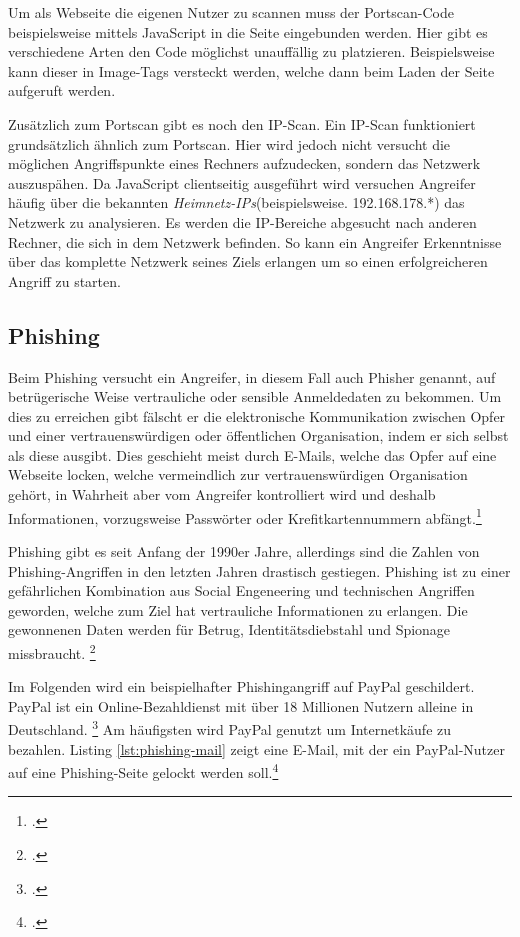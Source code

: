 Um als Webseite die eigenen Nutzer zu scannen muss der Portscan-Code beispielsweise mittels JavaScript in die Seite eingebunden werden. Hier gibt es verschiedene Arten den Code möglichst unauffällig zu platzieren. Beispielsweise kann dieser in Image-Tags versteckt werden, welche dann beim Laden der Seite aufgeruft werden.

Zusätzlich zum Portscan gibt es noch den IP-Scan. Ein IP-Scan funktioniert grundsätzlich ähnlich zum Portscan. Hier wird jedoch nicht versucht die möglichen Angriffspunkte eines Rechners aufzudecken, sondern das Netzwerk auszuspähen. Da JavaScript clientseitig ausgeführt wird versuchen Angreifer häufig über die bekannten \textit{Heimnetz-IPs}(beispielsweise. 192.168.178.*) das Netzwerk zu analysieren. Es werden die IP-Bereiche abgesucht nach anderen Rechner, die sich in dem Netzwerk befinden. So kann ein Angreifer Erkenntnisse über das komplette Netzwerk seines Ziels erlangen um so einen erfolgreicheren Angriff zu starten.

\subsection{Phishing}

Beim Phishing versucht ein Angreifer, in diesem Fall auch Phisher genannt, auf betrügerische Weise vertrauliche oder sensible Anmeldedaten zu bekommen. Um dies zu erreichen gibt fälscht er die elektronische Kommunikation zwischen Opfer und einer vertrauenswürdigen oder öffentlichen Organisation, indem er sich selbst als diese ausgibt. Dies geschieht meist durch E-Mails, welche das Opfer auf eine Webseite locken, welche vermeindlich zur vertrauenswürdigen Organisation gehört, in Wahrheit aber vom Angreifer kontrolliert wird und deshalb Informationen, vorzugsweise Passwörter oder Krefitkartennummern abfängt.\footcite[Vgl.][1]{phishing}

Phishing gibt es seit Anfang der 1990er Jahre, allerdings sind die Zahlen von Phishing-Angriffen in den letzten Jahren drastisch gestiegen. Phishing ist zu einer gefährlichen Kombination aus Social Engeneering und technischen Angriffen geworden, welche zum Ziel hat vertrauliche Informationen zu erlangen. Die gewonnenen Daten werden für Betrug, Identitätsdiebstahl und Spionage missbraucht. \footcite[Vgl.][1\psq]{phishing}

Im Folgenden wird ein beispielhafter Phishingangriff auf PayPal geschildert. PayPal ist ein Online-Bezahldienst mit über 18 Millionen Nutzern alleine in Deutschland. \footcite[Vgl.][]{paypal} Am häufigsten wird PayPal genutzt um Internetkäufe zu bezahlen. Listing \ref{lst:phishing-mail} zeigt eine E-Mail, mit der ein PayPal-Nutzer auf eine Phishing-Seite gelockt werden soll.\footcite[Vgl.][10]{phishing}

